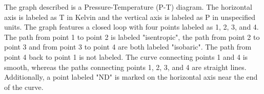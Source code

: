 The graph described is a Pressure-Temperature (P-T) diagram. The horizontal axis is labeled as T in Kelvin and the vertical axis is labeled as P in unspecified units. The graph features a closed loop with four points labeled as 1, 2, 3, and 4. The path from point 1 to point 2 is labeled "isentropic", the path from point 2 to point 3 and from point 3 to point 4 are both labeled "isobaric". The path from point 4 back to point 1 is not labeled. The curve connecting points 1 and 4 is smooth, whereas the paths connecting points 1, 2, 3, and 4 are straight lines. Additionally, a point labeled "ND" is marked on the horizontal axis near the end of the curve.
